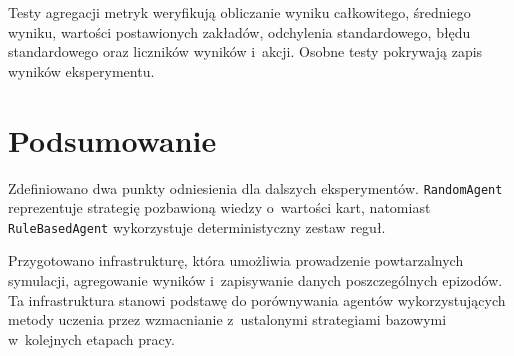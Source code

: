 Testy agregacji metryk weryfikują obliczanie wyniku całkowitego,
średniego wyniku, wartości postawionych zakładów, odchylenia
standardowego, błędu standardowego oraz liczników wyników i~akcji.
Osobne testy pokrywają zapis wyników eksperymentu.

\section{Podsumowanie}
\label{sec:podsumowanie-agentow-bazowych}

Zdefiniowano dwa punkty odniesienia dla dalszych
eksperymentów. \texttt{RandomAgent} reprezentuje strategię pozbawioną
wiedzy o~wartości kart, natomiast \texttt{RuleBasedAgent} wykorzystuje
deterministyczny zestaw reguł.

Przygotowano infrastrukturę, która umożliwia prowadzenie powtarzalnych
symulacji, agregowanie wyników
i~zapisywanie danych poszczególnych epizodów. Ta infrastruktura stanowi podstawę
do porównywania agentów wykorzystujących metody uczenia przez
wzmacnianie z~ustalonymi strategiami bazowymi w~kolejnych etapach
pracy.
